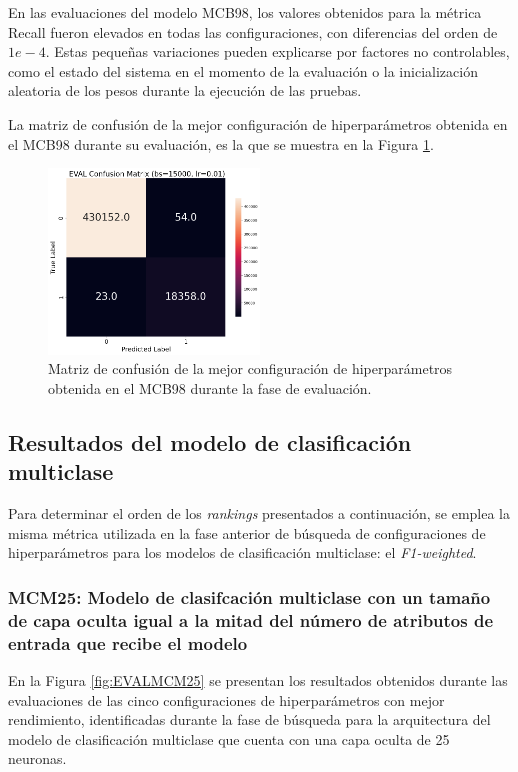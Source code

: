 En las evaluaciones del modelo MCB98, los valores obtenidos para la métrica Recall fueron elevados en todas las configuraciones, con diferencias del orden de $1e-4$. Estas pequeñas variaciones pueden explicarse por factores no controlables, como el estado del sistema en el momento de la evaluación o la inicialización aleatoria de los pesos durante la ejecución de las pruebas.


La matriz de confusión de la mejor configuración de hiperparámetros obtenida en el MCB98 durante su evaluación, es la que se muestra en la Figura \ref{fig:MC_EVAL_MCB98}.

\begin{figure}[H]
    \centering
    \includegraphics[width=0.5\textwidth]{./img/evaluacion/matrices_confusion/MC_EVAL_MCB98.png}
    \caption{Matriz de confusión de la mejor configuración de hiperparámetros obtenida en el MCB98 durante la fase de evaluación.}
    \label{fig:MC_EVAL_MCB98}
\end{figure}




\subsection{Resultados del modelo de clasificación multiclase}
Para determinar el orden de los \textit{rankings} presentados a continuación, se emplea la misma métrica utilizada en la fase anterior de búsqueda de configuraciones de hiperparámetros para los modelos de clasificación multiclase: el \textit{F1-weighted}.

\subsubsection{MCM25: Modelo de clasifcación multiclase con un tamaño de capa oculta igual a la mitad del número de atributos de entrada que recibe el modelo}

En la Figura \ref{fig:EVALMCM25} se presentan los resultados obtenidos durante las evaluaciones de las cinco configuraciones de hiperparámetros con mejor rendimiento, identificadas durante la fase de búsqueda para la arquitectura del modelo de clasificación multiclase que cuenta con una capa oculta de 25 neuronas.

